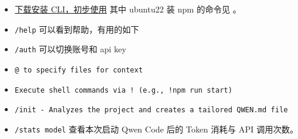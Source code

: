 
\begin{itemize}
\item \href{https://help.aliyun.com/zh/model-studio/qwen-code#bfe3dff25ecxb}{下载安装 CLI，初步使用} 其中 ubuntu22 装 npm 的命令见 。
\item \verb`/help` 可以看到帮助，有用的如下
\item \verb`/auth` 可以切换账号和 api key
\item \verb`@ to specify files for context`
\item \verb`Execute shell commands via ! (e.g., !npm run start)`
\item \verb`/init - Analyzes the project and creates a tailored QWEN.md file`
\item \verb`/stats model` 查看本次启动 Qwen Code 后的 Token 消耗与 API 调用次数。
\end{itemize}


